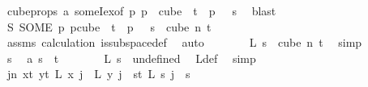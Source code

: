 \begin{isabellebody}
\ cube{\isacharunderscore}{\kern0pt}props{\isacharparenleft}{\kern0pt}{}{\isacharparenright}{\kern0pt}\ a\ someI{\isacharunderscore}{\kern0pt}ex{\isacharbrackleft}{\kern0pt}of\ {\isachardoublequoteopen}{\isasymlambda}p{\isachardot}{\kern0pt}\ p\ {\isasymin}\ cube\ {}\ t\ {\isasymand}\ p\ {}\ {\isacharequal}{\kern0pt}\ s{\isachardoublequoteclose}{\isacharbrackright}{\kern0pt}\ \isamarkupfalse%
\ blast\isanewline
\ \ \ \ \isamarkupfalse%
\ \isamarkupfalse%
\ {\isachardoublequoteopen}S\ {\isacharparenleft}{\kern0pt}SOME\ p{\isachardot}{\kern0pt}\ p{\isasymin}cube\ {}\ t\ {\isasymand}\ p\ {}\ {\isacharequal}{\kern0pt}\ s{\isacharparenright}{\kern0pt}\ {\isasymin}\ cube\ n\ t{\isachardoublequoteclose}\isanewline
\ \ \ \ \ \ \isamarkupfalse%
\ assms{\isacharparenleft}{\kern0pt}{}{\isacharparenright}{\kern0pt}\ calculation{\isacharparenleft}{\kern0pt}{}{\isacharparenright}{\kern0pt}\ is{\isacharunderscore}{\kern0pt}subspace{\isacharunderscore}{\kern0pt}def\ \isamarkupfalse%
\ auto\isanewline
\ \ \ \ \isamarkupfalse%
\ \isamarkupfalse%
\ {\isachardoublequoteopen}L\ s\ {\isasymin}\ cube\ n\ t{\isachardoublequoteclose}\ \isamarkupfalse%
\ simp\isanewline
\ \ \isamarkupfalse%
\isanewline
\ \ \ \ \isamarkupfalse%
\ s\ \isamarkupfalse%
\ a{\isacharcolon}{\kern0pt}\ {\isachardoublequoteopen}s\ {\isasymnotin}\ {\isacharbraceleft}{\kern0pt}{\isachardot}{\kern0pt}{\isachardot}{\kern0pt}{\isacharless}{\kern0pt}t{\isacharbraceright}{\kern0pt}{\isachardoublequoteclose}\isanewline
\ \ \ \ \isamarkupfalse%
\ \isamarkupfalse%
\ {\isachardoublequoteopen}L\ s\ {\isacharequal}{\kern0pt}\ undefined{\isachardoublequoteclose}\ \isamarkupfalse%
\ L{\isacharunderscore}{\kern0pt}def\ \isamarkupfalse%
\ simp\isanewline
\ \ \isamarkupfalse%
\isanewline
\ \ \isamarkupfalse%
\ \isamarkupfalse%
\ {\isachardoublequoteopen}{\isacharparenleft}{\kern0pt}{\isasymforall}j{\isacharless}{\kern0pt}n{\isachardot}{\kern0pt}\ {\isacharparenleft}{\kern0pt}{\isasymforall}x{\isacharless}{\kern0pt}t{\isachardot}{\kern0pt}\ {\isasymforall}y{\isacharless}{\kern0pt}t{\isachardot}{\kern0pt}\ L\ x\ j\ {\isacharequal}{\kern0pt}\ L\ y\ j{\isacharparenright}{\kern0pt}\ {\isasymor}\ {\isacharparenleft}{\kern0pt}{\isasymforall}s{\isacharless}{\kern0pt}t{\isachardot}{\kern0pt}\ L\ s\ j\ {\isacharequal}{\kern0pt}\ s{\isacharparenright}{\kern0pt}{\isacharparenright}{\kern0pt}{\isachardoublequoteclose}\isanewline

\end{isabellebody}
